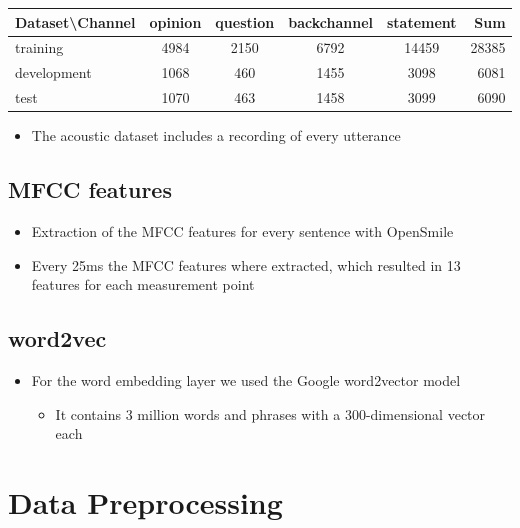 \documentclass[a0,landscape]{a0poster}
\begin{document}
\begin{multicols}{3}
\large
\begin{tabular}{ l| c c c c || r}
	Dataset\textbackslash Channel & opinion & question & backchannel & statement & Sum\\
	\hline
	training & 4984 & 2150 & 6792 & 14459 & 28385\\
	development & 1068 & 460 & 1455 & 3098 & 6081\\
	test & 1070 & 463 & 1458 & 3099 & 6090\\
\end{tabular}
\normalsize

\begin{itemize}
	\item The acoustic dataset includes a recording of every utterance
\end{itemize}

\subsection*{MFCC features}
\begin{itemize}
	\item Extraction of the MFCC features for every sentence with OpenSmile
	\item Every 25ms the MFCC features where extracted, which resulted in 13 features for each measurement point
\end{itemize}

\subsection*{word2vec}
\begin{itemize}
	\item For the word embedding layer we used the Google word2vector model
	\begin{itemize}
		\item It contains 3 million words and phrases with a 300-dimensional vector each
	\end{itemize}
\end{itemize}



\section*{Data Preprocessing}
%


\end{multicols}
\end{document}
